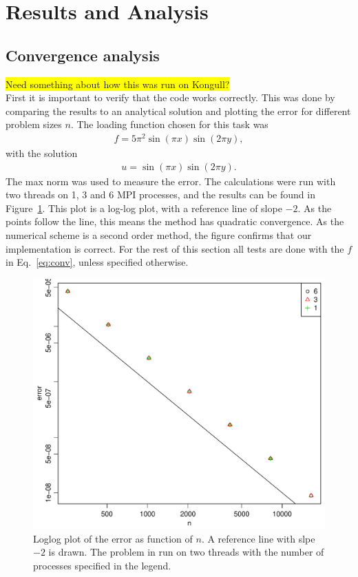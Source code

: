 \section{Results and Analysis}
%
\subsection{Convergence analysis}
\colorbox{yellow}{Need something about how this was run on Kongull?}\\
First it is important to verify that the code works correctly. This was done by comparing the results to an analytical solution and plotting the error for different problem sizes $n$. The loading function chosen for this task was 
\begin{align}
  \label{eq:conv} 
  f = 5 \pi^2 \sin (\pi x) \sin (2 \pi y),
\end{align}
with the solution
\begin{align}
  u = \sin (\pi x) \sin (2 \pi y). 
\end{align}
The max norm was used to measure the error. The calculations were run with two threads on 1, 3 and 6 MPI processes, and the results can be found in Figure~\ref{fig:errVsn}. This plot is a log-log plot, with a reference line of slope $-2$. As the points follow the line, this means the method has quadratic convergence. As the numerical scheme is a second order method, the figure confirms that our implementation is correct. For the rest of this section all tests are done with the $f$ in Eq.~\eqref{eq:conv}, unless specified otherwise.\\
%
\begin{figure}[h!]
\begin{center}
    \includegraphics[scale=0.4]{./Figures/errVsn.pdf}
\end{center}
  \vspace{-1\baselineskip}
\caption{Loglog plot of the error as function of $n$. A reference line with slpe $-2$ is drawn. The problem in run on two threads with the number of processes specified in the legend.}
\label{fig:errVsn}
\end{figure}
%
\\
